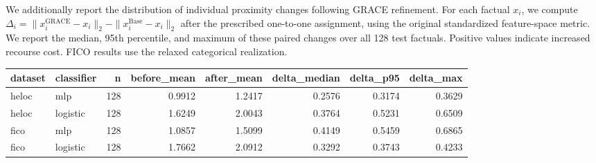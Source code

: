 We additionally report the distribution of individual proximity changes
following GRACE refinement. For each factual $x_i$, we compute
$\Delta_i=\|x_i^{\mathrm{GRACE}}-x_i\|_2-
\|x_i^{\mathrm{Base}}-x_i\|_2$
after the prescribed one-to-one assignment, using the original standardized
feature-space metric. We report the median, 95th percentile, and maximum
of these paired changes over all 128 test factuals. Positive values indicate
increased recourse cost. FICO results use the relaxed categorical realization.

\begin{tabular}{llrrrrrr}
\toprule
dataset & classifier & n & before_mean & after_mean & delta_median & delta_p95 & delta_max \\
\midrule
heloc & mlp & 128 & 0.9912 & 1.2417 & 0.2576 & 0.3174 & 0.3629 \\
heloc & logistic & 128 & 1.6249 & 2.0043 & 0.3764 & 0.5231 & 0.6509 \\
fico & mlp & 128 & 1.0857 & 1.5099 & 0.4149 & 0.5459 & 0.6865 \\
fico & logistic & 128 & 1.7662 & 2.0912 & 0.3292 & 0.3743 & 0.4233 \\
\bottomrule
\end{tabular}
